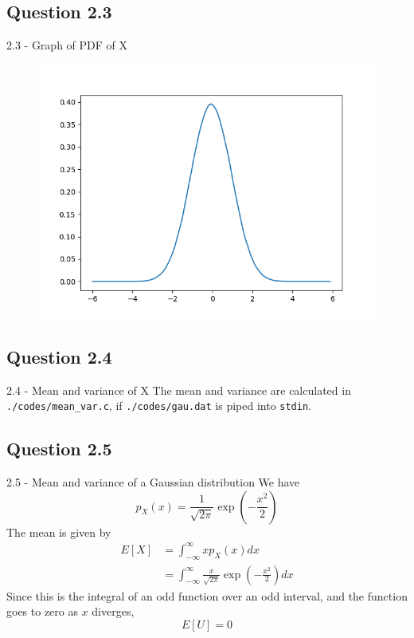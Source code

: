 \documentclass{beamer}
\begin{document}
\subsection{Question 2.3}
\begin{frame}{2.3 - Graph of PDF of X}
    \begin{figure}[!ht]
        \includegraphics[width=\textheight]{figs/pdf_gau.png}
    \end{figure}
\end{frame}

\subsection{Question 2.4}
\begin{frame}{2.4 - Mean and variance of X}
    The mean and variance are calculated in \texttt{./codes/mean\_var.c}, if \texttt{./codes/gau.dat} is piped into \texttt{stdin}.
\end{frame}

\subsection{Question 2.5}
\begin{frame}{2.5 - Mean and variance of a Gaussian distribution}
    We have
    \begin{equation}
        p_X(x) = \frac{1}{\sqrt{2 \pi}} \exp\left(-\frac{x^2}{2}\right)
    \end{equation}
    The mean is given by
    \begin{align}
        E\left[X\right] &= \int_{-\infty}^{\infty}{x p_X(x) dx} \\
        &= \int_{-\infty}^{\infty}{\frac{x}{\sqrt{2 \pi}} \exp\left(-\frac{x^2}{2}\right) dx}
    \end{align}
    Since this is the integral of an odd function over an odd interval, and the function goes to zero as $x$ diverges,
    \begin{equation}
        E\left[U\right] = 0
    \end{equation}
\end{frame}
\end{document}
